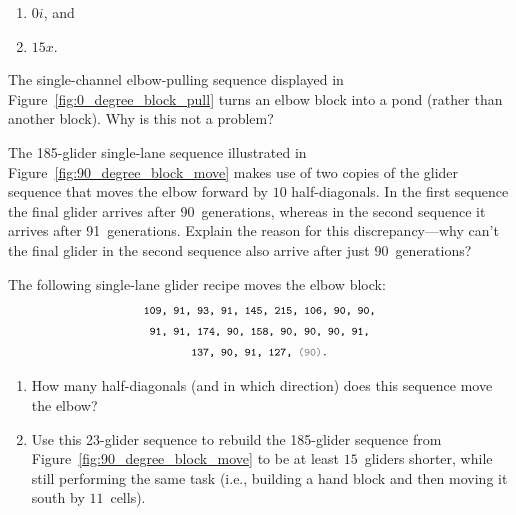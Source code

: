 \begin{multicols}{2}
\begin{problem}
\begin{enumerate}[label=\bf\color{ocre}(\alph*)]
			\item $0i$, and
			
			\item $15x$.
		\end{enumerate}
	\end{problem}
	
	
	\mfilbreak
	
	
	\begin{problem}\label{exer:block_pull_pond}
		The single-channel elbow-pulling sequence displayed in Figure~\ref{fig:0_degree_block_pull} turns an elbow block into a pond (rather than another block). Why is this not a problem?
	\end{problem}
	
	
	\mfilbreak
	
	
	\begin{problemstar}\label{exer:single_lane_glider_final_glider_explain}
		The 185-glider single-lane sequence illustrated in Figure~\ref{fig:90_degree_block_move} makes use of two copies of the glider sequence that moves the elbow forward by $10$ half-diagonals. In the first sequence the final glider arrives after 90~generations, whereas in the second sequence it arrives after 91~generations. Explain the reason for this discrepancy---why can't the final glider in the second sequence also arrive after just 90~generations?
	\end{problemstar}
	
	
	\mfilbreak
	
	
	\begin{problem}\label{exer:push_elbow_longer} 
		The following single-lane glider recipe moves the elbow block:
		\begin{align*}
		& \text{\texttt{\footnotesize 109, 91, 93, 91, 145, 215, 106, 90, 90,}} \\
		& \text{\texttt{\footnotesize~91, 91, 174, 90, 158, 90, 90, 90, 91,}} \\
		& \text{\texttt{\footnotesize~~~~~~~~137, 90, 91, 127, {\color{gray}(90)}.}}
		\end{align*}
		
		\begin{enumerate}[label=\bf\color{ocre}(\alph*)]
			\item How many half-diagonals (and in which direction) does this sequence move the elbow?
			
			\item Use this 23-glider sequence to rebuild the 185-glider sequence from Figure~\ref{fig:90_degree_block_move} to be at least $15$~gliders shorter, while still performing the same task (i.e., building a hand block and then moving it south by $11$~cells).
		\end{enumerate}
	\end{problem}
	

\end{multicols}
